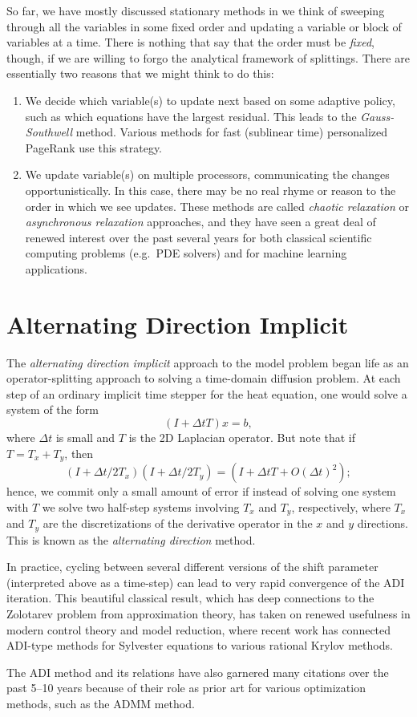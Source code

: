 \documentclass[12pt, leqno]{article} %
\begin{document}
So far, we have mostly discussed stationary methods in we think of
sweeping through all the variables in some fixed order and
updating a variable or block of variables at a time.  There is nothing
that say that the order must be {\em fixed}, though, if we are willing
to forgo the analytical framework of splittings.  There are essentially
two reasons that we might think to do this:
\begin{enumerate}
\item
  We decide which variable(s) to update next based on some adaptive
  policy, such as which equations have the largest residual.  This
  leads to the {\em Gauss-Southwell} method.  Various methods for fast
  (sublinear time) personalized PageRank use this strategy.
\item
  We update variable(s) on multiple processors, communicating the
  changes opportunistically.  In this case, there may be no real rhyme
  or reason to the order in which we see updates.  These methods are
  called {\em chaotic relaxation} or {\em asynchronous relaxation}
  approaches, and they have seen a great deal of renewed interest over
  the past several years for both classical scientific computing problems
  (e.g.~PDE solvers) and for machine learning applications.
\end{enumerate}

\section{Alternating Direction Implicit}

The {\em alternating direction implicit} approach to the model problem
began life as an operator-splitting approach to solving a time-domain
diffusion problem.  At each step of an ordinary implicit time stepper
for the heat equation, one would solve a system of the form
\[
  (I+\Delta t T) x = b,
\]
where $\Delta t$ is small and $T$ is the 2D Laplacian operator.  But
note that if $T = T_x + T_y$, then
\[
  (I+\Delta t/2 T_x)(I+ \Delta t/2 T_y) = (I+\Delta t T + O(\Delta t)^2);
\]
hence, we commit only a small amount of error if instead of solving one
system with $T$ we solve two half-step systems involving $T_x$ and $T_y$,
respectively, where $T_x$ and $T_y$ are the discretizations of the
derivative operator in the $x$ and $y$ directions.  This is known as the
{\em alternating direction} method.
%

In practice, cycling between several different versions of the shift parameter
(interpreted above as a time-step) can lead to very rapid convergence of
the ADI iteration.  This beautiful classical result, which has deep
connections to the Zolotarev problem from approximation theory, has taken
on renewed usefulness in modern control theory and model reduction,
where recent work has connected ADI-type methods for Sylvester equations
to various rational Krylov methods.

The ADI method and its relations have also garnered many citations over
the past 5--10 years because of their role as prior art for various
optimization methods, such as the ADMM method.
\end{document}
